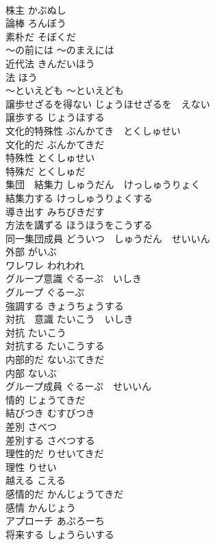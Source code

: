 \documentclass[8pt]{extreport}
\begin{document}
\begin{CJK}{UTF8}{min}
\\	株主	かぶぬし	
\\	論棒	ろんぼう	
\\	素朴だ	そぼくだ	
\\	〜の前には	〜のまえには	
\\	近代法	きんだいほう	
\\	法	ほう	
\\	〜といえども	〜といえども	
\\	譲歩せざるを得ない	じょうほせざるを　えない	
\\	譲歩する	じょうほする	
\\	文化的特殊性	ぶんかてき　とくしゅせい	
\\	文化的だ	ぶんかてきだ	
\\	特殊性	とくしゅせい	
\\	特殊だ	とくしゅだ	
\\	集団　結集力	しゅうだん　けっしゅうりょく	
\\	結集力する	けっしゅうりょくする	
\\	導き出す	みちびきだす	
\\	方法を講ずる	ほうほうをこうずる	
\\	同一集団成員	どういつ　しゅうだん　せいいん	
\\	外部	がいぶ	
\\	ワレワレ	われわれ	
\\	グループ意識	ぐるーぷ　いしき	
\\	グループ	ぐるーぷ	
\\	強調する	きょうちょうする	
\\	対抗　意識	たいこう　いしき	
\\	対抗	たいこう	
\\	対抗する	たいこうする	
\\	内部的だ	ないぶてきだ	
\\	内部	ないぶ	
\\	グループ成員	ぐるーぷ　せいいん	
\\	情的	じょうてきだ	
\\	結びつき	むすびつき	
\\	差別	さべつ	
\\	差別する	さべつする	
\\	理性的だ	りせいてきだ	
\\	理性	りせい	
\\	越える	こえる	
\\	感情的だ	かんじょうてきだ	
\\	感情	かんじょう	
\\	アプローチ	あぷろーち	
\\	将来する	しょうらいする	

\end{CJK}
\end{document}
